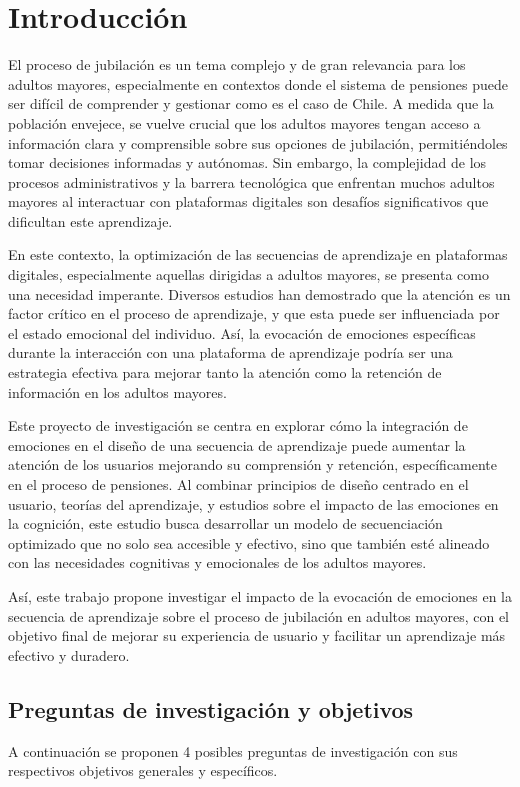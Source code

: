 \section{Introducción}

El proceso de jubilación es un tema complejo y de gran relevancia para los adultos mayores, especialmente en contextos donde el sistema de pensiones puede ser difícil de comprender y gestionar como es el caso de Chile. A medida que la población envejece, se vuelve crucial que los adultos mayores tengan acceso a información clara y comprensible sobre sus opciones de jubilación, permitiéndoles tomar decisiones informadas y autónomas. Sin embargo, la complejidad de los procesos administrativos y la barrera tecnológica que enfrentan muchos adultos mayores al interactuar con plataformas digitales son desafíos significativos que dificultan este aprendizaje.

En este contexto, la optimización de las secuencias de aprendizaje en plataformas digitales, especialmente aquellas dirigidas a adultos mayores, se presenta como una necesidad imperante. Diversos estudios han demostrado que la atención es un factor crítico en el proceso de aprendizaje, y que esta puede ser influenciada por el estado emocional del individuo. Así, la evocación de emociones específicas durante la interacción con una plataforma de aprendizaje podría ser una estrategia efectiva para mejorar tanto la atención como la retención de información en los adultos mayores.

Este proyecto de investigación se centra en explorar cómo la integración de emociones en el diseño de una secuencia de aprendizaje puede aumentar la atención de los usuarios mejorando su comprensión y retención, específicamente en el proceso de pensiones. Al combinar principios de diseño centrado en el usuario, teorías del aprendizaje, y estudios sobre el impacto de las emociones en la cognición, este estudio busca desarrollar un modelo de secuenciación optimizado que no solo sea accesible y efectivo, sino que también esté alineado con las necesidades cognitivas y emocionales de los adultos mayores.

Así, este trabajo propone investigar el impacto de la evocación de emociones en la secuencia de aprendizaje sobre el proceso de jubilación en adultos mayores, con el objetivo final de mejorar su experiencia de usuario y facilitar un aprendizaje más efectivo y duradero.

\subsection*{Preguntas de investigación y objetivos}
A continuación se proponen 4 posibles preguntas de investigación con sus respectivos objetivos generales y específicos. 


